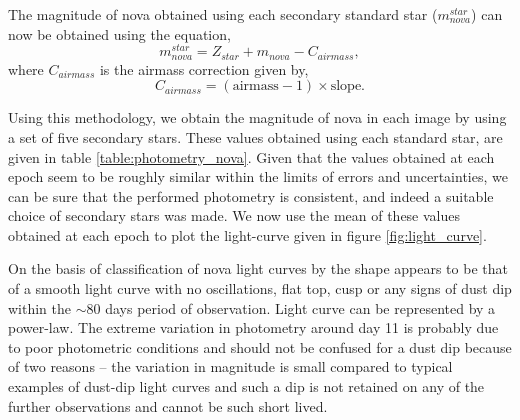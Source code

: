 \documentclass{tda}
\begin{document}
	The magnitude of nova obtained using each secondary standard star (\(m^{star}_{nova}\)) can now be obtained using the equation,
	\begin{equation}
		m^{star}_{nova} = Z_{star} + m_{nova} - C_{airmass},
	\end{equation}
	where \(C_{airmass}\) is the airmass correction given by,
	\begin{equation}
		C_{airmass} = (\textrm{airmass} -1) \times \textrm{slope}.
	\end{equation}

	Using this methodology, we obtain the magnitude of nova in each image by using a set of five secondary stars. These values obtained using each standard star, are given in table \ref{table:photometry_nova}. Given that the values obtained at each epoch seem to be roughly similar within the limits of errors and uncertainties, we can be sure that the performed photometry is consistent, and indeed a suitable choice of secondary stars was made. We now use the mean of these values obtained at each epoch to plot the light-curve given in figure \ref{fig:light_curve}.

	On the basis of classification of nova light curves by \citet{2010AJ....140...34S} the shape appears to be that of a smooth light curve with no oscillations, flat top, cusp or any signs of dust dip within the \(\sim 80\) days period of observation. Light curve can be represented by a power-law. The extreme variation in photometry around day 11 is probably due to poor photometric conditions and should not be confused for a dust dip because of two reasons -- the variation in magnitude is small compared to typical examples of dust-dip light curves and such a dip is not retained on any of the further observations and cannot be such short lived.
\end{document}
